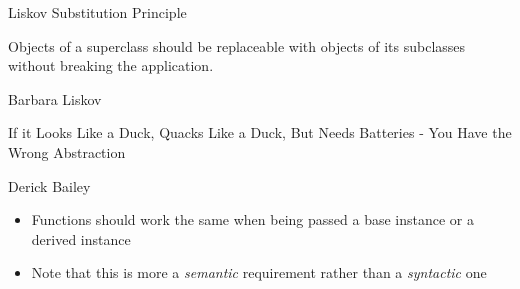 
\begin{frame}{Liskov Substitution Principle}
%
\vspace{-5pt}
\begin{defbox}[Definition]
\small
Objects of a superclass should be replaceable with objects of its subclasses without breaking the application.

\vspace{-12pt}
\begin{flushright}
Barbara Liskov
\end{flushright}
\end{defbox}
\pause

\vspace{-9pt}
\begin{defbox}
\small
If it Looks Like a Duck, Quacks Like a Duck, But Needs Batteries - You Have the Wrong Abstraction

\vspace{-12pt}
\begin{flushright}
Derick Bailey
\end{flushright}
\end{defbox}
\pause

\vspace{-5pt}
\begin{itemize}
\item Functions should work the same when being passed a base instance or a derived instance
\item Note that this is more a \emph{semantic} requirement rather than a \emph{syntactic} one
\end{itemize}
%
\end{frame}


